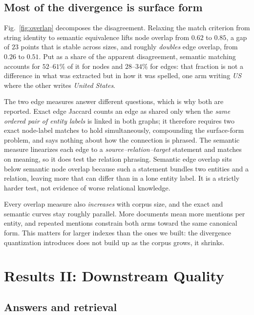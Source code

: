 \documentclass[conference, table]{IEEEtran}
\begin{document}
\subsection{Most of the divergence is surface form}



\noindent
Fig.~\ref{fig:overlap} decomposes the disagreement. Relaxing the match criterion from string identity to semantic equivalence lifts node overlap from $0.62$ to $0.85$, a gap of $23$ points that is stable across sizes, and roughly \emph{doubles} edge overlap, from $0.26$ to $0.51$. Put as a share of the apparent disagreement, semantic matching accounts for $52$--$61\%$ of it for nodes and $28$--$34\%$ for edges: that fraction is not a difference in what was extracted but in how it was spelled, one arm writing \emph{US} where the other writes \emph{United States}.

\noindent
The two edge measures answer different questions, which is why both are reported. Exact edge Jaccard counts an edge as shared only when the \emph{same ordered pair of entity labels} is linked in both graphs; it therefore requires two exact node-label matches to hold simultaneously, compounding the surface-form problem, and says nothing about how the connection is phrased. The semantic measure linearizes each edge to a \emph{source--relation--target} statement and matches on meaning, so it does test the relation phrasing. Semantic edge overlap sits below semantic node overlap because such a statement bundles two entities and a relation, leaving more that can differ than in a lone entity label. It is a strictly harder test, not evidence of worse relational knowledge.

\noindent
Every overlap measure also \emph{increases} with corpus size, and the exact and semantic curves stay roughly parallel. More documents mean more mentions per entity, and repeated mentions constrain both arms toward the same canonical form. This matters for larger indexes than the ones we built: the divergence quantization introduces does not build up as the corpus grows, it shrinks.



\section{Results II: Downstream Quality}\label{sec:qa}

\subsection{Answers and retrieval}
\end{document}
